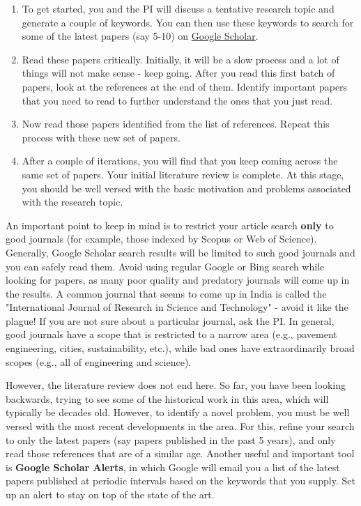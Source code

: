 \documentclass[12pt]{article}
\begin{document}
\begin{enumerate}
	\item To get started, you and the PI will discuss a tentative research topic and generate a couple of keywords. You can then use these keywords to search for some of the latest papers (say 5-10) on \href{https://scholar.google.com/}{Google Scholar}.
	\item Read these papers critically. Initially, it will be a slow process and a lot of things will not make sense - keep going. After you read this first batch of papers, look at the references at the end of them. Identify important papers that you need to read to further understand the ones that you just read.
	\item Now read those papers identified from the list of references. Repeat this process with these new set of papers.
	\item After a couple of iterations, you will find that you keep coming across the same set of papers. Your initial literature review is complete. At this stage, you should be well versed with the basic motivation and problems associated with the research topic.
\end{enumerate}

An important point to keep in mind is to restrict your article search \textbf{only} to good journals (for example, those indexed by Scopus or Web of Science). Generally, Google Scholar search results will be limited to such good journals and you can safely read them. Avoid using regular Google or Bing search while looking for papers, as many poor quality and predatory journals will come up in the results. A common journal that seems to come up in India is called the "International Journal of Research in Science and Technology" - avoid it like the plague! If you are not sure about a particular journal, ask the PI. In general, good journals have a scope that is restricted to a narrow area (e.g., pavement engineering, cities, sustainability, etc.), while bad ones have extraordinarily broad scopes (e.g., all of engineering and science). 

However, the literature review does not end here. So far, you have been looking backwards, trying to see some of the historical work in this area, which will typically be decades old. However, to identify a novel problem, you must be well versed with the most recent developments in the area. For this, refine your search to only the latest papers (say papers published in the past 5 years), and only read those references that are of a similar age. Another useful and important tool is \textbf{Google Scholar Alerts}, in which Google will email you a list of the latest papers published at periodic intervals based on the keywords that you supply. Set up an alert to stay on top of the state of the art.
\end{document}
